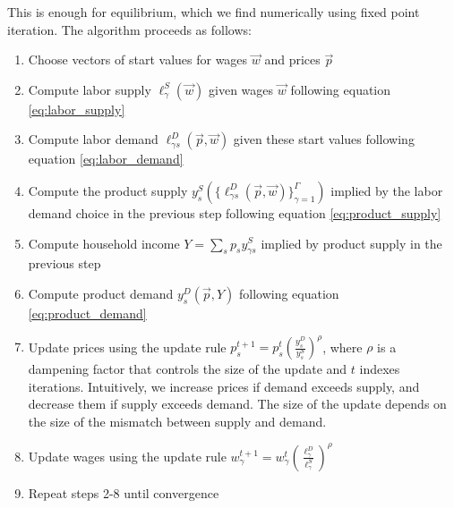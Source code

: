 \documentclass[12pt]{article}
\def\g{\gamma}
\theoremstyle{definition}
\theoremstyle{plain}
\begin{document}
This is enough for equilibrium, which we find numerically using fixed point iteration. The algorithm proceeds as follows:
\begin{enumerate}
	\item Choose vectors of start values for wages $\vec{w}$ and prices $\vec{p}$
	\item Compute labor supply $\ell_{\g}^S(\vec{w})$ given wages $\vec{w}$ following equation \ref{eq:labor_supply}
	\item Compute labor demand $\ell_{\g s}^D \left(\vec{p}, \vec{w} \right)$ given these start values following equation \ref{eq:labor_demand}
	\item Compute the product supply $y_s^S\left( \{\ell_{\g s}^D (\vec{p}, \vec{w}) \}_{\g=1}^{\Gamma} \right)$ implied by the labor demand choice in the previous step following equation \ref{eq:product_supply}
	\item Compute household income $Y = \sum_s p_s y_{\g s}^S$ implied by product supply in the previous step
	\item Compute product demand $y_s^D(\vec{p},Y)$ following equation \ref{eq:product_demand}
	\item Update prices using the update rule $p_s^{t+1} = p_s^{t} \left(\frac{y_s^D}{y_s^S}\right)^{\rho}$, where $\rho$ is a dampening factor that controls the size of the update and $t$ indexes iterations. Intuitively, we increase prices if demand exceeds supply, and decrease them if supply exceeds demand. The size of the update depends on the size of the mismatch between supply and demand. 
	\item Update wages using the update rule $w_{\g}^{t+1} = w_{\g}^{t} \left(\frac{\ell_{\g}^D}{\ell_{\g}^S}\right)^{\rho}$
	\item Repeat steps 2-8 until convergence
\end{enumerate}

\end{document}
